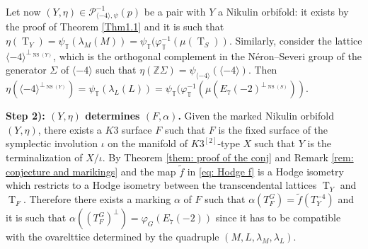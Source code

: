 \documentclass{amsart}
\theoremstyle{definition}
\numberwithin{equation}{section}
\numberwithin{equation}{section} \theoremstyle{definition}
\DeclareMathOperator{\NS}{NS}
\DeclareMathOperator{\T}{T}
\begin{document}
Let now $(Y,\eta)\in\mathcal{P}_{\langle -4\rangle,\psi}^{-1}(p)$ be a pair with $Y$ a Nikulin orbifold: it exists by the proof of Theorem \ref{Thm1.1} and it is such that $\eta(\T_Y)=\psi_{\mathbb{T}}(\lambda_M(M))=\psi_{\mathbb{T}}(\varphi_{\mathbb{T}}^{-1}(\mu(\T_S))$. Similarly,  consider the lattice $\langle -4\rangle^{\perp_{\NS(Y)}}$, which is the orthogonal complement in the N\'eron--Severi group of the generator $\Sigma$ of $\langle -4\rangle$ such that $\eta(\mathbb{Z}\Sigma)=\psi_{\langle -4\rangle}(\langle -4\rangle)$. Then  $\eta(\langle -4\rangle^{\perp_{\NS(Y)}})=\psi_{\mathbb{T}}(\lambda_L(L))=\psi_{\mathbb{T}}(\varphi_{\mathbb{T}}^{-1}(\mu(E_7(-2)^{\perp_{\NS(S)}}))$.


{\bf Step 2): $(Y,\eta)$ determines $(F,\alpha)$.} Given the marked Nikulin orbifold $(Y,\eta)$, there exists a $K3$ surface $F$ such that $F$ is the fixed surface of the symplectic involution $\iota$ on the  manifold of $K3^{[2]}$-type $X$ such that $Y$ is the terminalization of $X/\iota$. By Theorem \ref{them: proof of the conj} and Remark \ref{rem: conjecture and marikings} and the map $\widetilde{f}$ in \eqref{eq: Hodge f} is a Hodge isometry which restricts to a Hodge isometry between the transcendental lattices $\T_Y$ and $\T_F$. Therefore there exists a marking $\alpha$ of $F$ such that $\alpha(T_F^G)=\widetilde{f}(T_Y^{ -4})$ and it is such that  $\alpha((T_F^G)^{\perp})=\varphi_G(E_7(-2))$ since it has to be compatible with the ovarelttice determined by the quadruple $(M,L,\lambda_M,\lambda_L)$.
\end{document}
